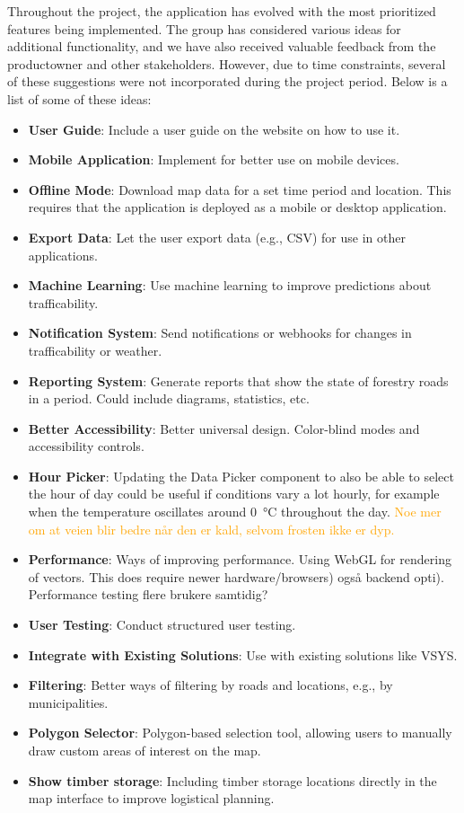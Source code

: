 Throughout the project, the application has evolved with the most prioritized features being implemented. The group has considered various ideas for additional functionality, and we have also received valuable feedback from the \gls{productowner} and other stakeholders. However, due to time constraints, several of these suggestions were not incorporated during the project period. Below is a list of some of these ideas:

\begin{itemize}
    \item \textbf{User Guide}: Include a user guide on the website on how to use it.
    \item \textbf{Mobile Application}: Implement for better use on mobile devices.
    \item \textbf{Offline Mode}: Download map data for a set time period and location. This requires that the application is deployed as a mobile or desktop application.
    \item \textbf{Export Data}: Let the user export data (e.g., CSV) for use in other applications.
    \item \textbf{Machine Learning}: Use machine learning to improve predictions about trafficability.
    \item \textbf{Notification System}: Send notifications or webhooks for changes in trafficability or weather.
    \item \textbf{Reporting System}: Generate reports that show the state of forestry roads in a period. Could include diagrams, statistics, etc.
    \item \textbf{Better Accessibility}: Better universal design. Color-blind modes and accessibility controls.
    \item \textbf{Hour Picker}: Updating the Data Picker component to also be able to select the hour of day could be useful if conditions vary a lot hourly, for example when the temperature oscillates around \qty{0}{\celsius} throughout the day. \textcolor{orange}{Noe mer om at veien blir bedre når den er kald, selvom frosten ikke er dyp.}
    \item \textbf{Performance}: Ways of improving performance. Using WebGL for rendering of vectors. This does require newer hardware/browsers) også backend opti). Performance testing flere brukere samtidig?
    \item \textbf{User Testing}: Conduct structured user testing.
    \item \textbf{Integrate with Existing Solutions}: Use with existing solutions like VSYS. 
    \item \textbf{Filtering}: Better ways of filtering by roads and locations, e.g., by municipalities.
    \item \textbf{Polygon Selector}: Polygon-based selection tool, allowing users to manually draw custom areas of interest on the map.
    \item \textbf{Show timber storage}: Including timber storage locations directly in the map interface to improve logistical planning.
\end{itemize}
